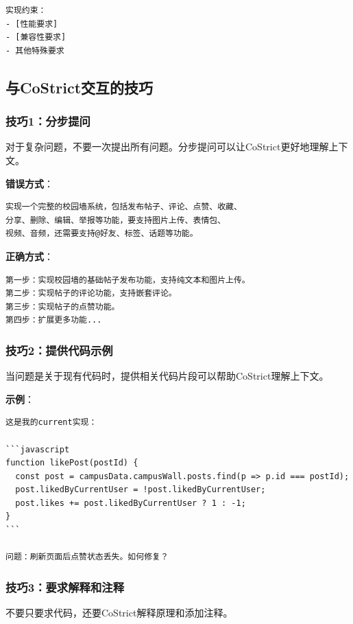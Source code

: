 \documentclass[12pt,a4paper]{article}
\begin{document}
\begin{itemize}
\begin{verbatim}
实现约束：
- [性能要求]
- [兼容性要求]
- 其他特殊要求
\end{verbatim}

\subsection{与CoStrict交互的技巧}

\subsubsection{技巧1：分步提问}

对于复杂问题，不要一次提出所有问题。分步提问可以让CoStrict更好地理解上下文。

\textbf{错误方式}：
\begin{verbatim}
实现一个完整的校园墙系统，包括发布帖子、评论、点赞、收藏、
分享、删除、编辑、举报等功能，要支持图片上传、表情包、
视频、音频，还需要支持@好友、标签、话题等功能。
\end{verbatim}

\textbf{正确方式}：
\begin{verbatim}
第一步：实现校园墙的基础帖子发布功能，支持纯文本和图片上传。
第二步：实现帖子的评论功能，支持嵌套评论。
第三步：实现帖子的点赞功能。
第四步：扩展更多功能...
\end{verbatim}

\subsubsection{技巧2：提供代码示例}

当问题是关于现有代码时，提供相关代码片段可以帮助CoStrict理解上下文。

\textbf{示例}：
\begin{verbatim}
这是我的current实现：

```javascript
function likePost(postId) {
  const post = campusData.campusWall.posts.find(p => p.id === postId);
  post.likedByCurrentUser = !post.likedByCurrentUser;
  post.likes += post.likedByCurrentUser ? 1 : -1;
}
```

问题：刷新页面后点赞状态丢失。如何修复？
\end{verbatim}

\subsubsection{技巧3：要求解释和注释}

不要只要求代码，还要CoStrict解释原理和添加注释。


\end{itemize}
\end{document}
